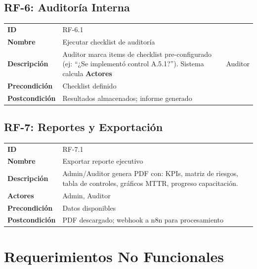 \documentclass[12pt,a4paper,oneside]{article}
\begin{document}
\subsection{RF-6: Auditoría Interna}

\begin{tabularx}{\linewidth}{|l|X|}
\hline
\textbf{ID} & RF-6.1 \\
\textbf{Nombre} & Ejecutar checklist de auditoría \\
\textbf{Descripción} & Auditor marca items de checklist pre-configurado (ej: ``¿Se implementó control A.5.1?''). Sistema calcula %
\textbf{Actores} & Auditor \\
\textbf{Precondición} & Checklist definido \\
\textbf{Postcondición} & Resultados almacenados; informe generado \\
\hline
\end{tabularx}

\subsection{RF-7: Reportes y Exportación}

\begin{tabularx}{\linewidth}{|l|X|}
\hline
\textbf{ID} & RF-7.1 \\
\textbf{Nombre} & Exportar reporte ejecutivo \\
\textbf{Descripción} & Admin/Auditor genera PDF con: KPIs, matriz de riesgos, tabla de controles, gráficos MTTR, progreso capacitación. \\
\textbf{Actores} & Admin, Auditor \\
\textbf{Precondición} & Datos disponibles \\
\textbf{Postcondición} & PDF descargado; webhook a n8n para procesamiento \\
\hline
\end{tabularx}

\section{Requerimientos No Funcionales}
\end{document}
